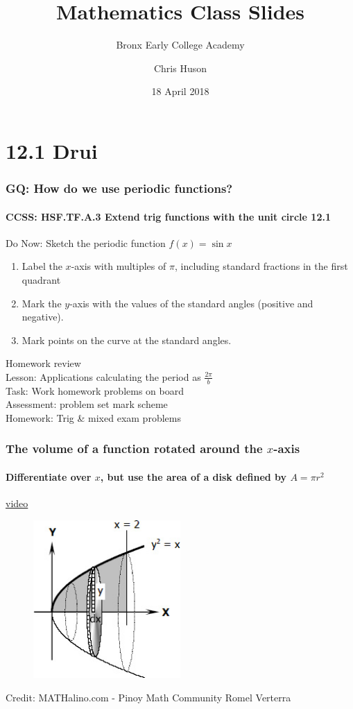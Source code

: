 \documentclass{beamer}
\title{Mathematics Class Slides}
\subtitle{Bronx Early College Academy}
\author{Chris Huson}
\date{18 April 2018}
\begin{document}
\frame{\titlepage}


\section{12.1 Drui}
\frame
{
  \frametitle{GQ: How do we use periodic functions?}
  \framesubtitle{CCSS: HSF.TF.A.3 Extend trig functions with the unit circle \qquad \alert{12.1}}

  \begin{block}{Do Now: Sketch the periodic function $f(x)=\sin{x}$}
    \begin{enumerate}
    \item Label the $x$-axis with multiples of $\pi$, including standard fractions in the first quadrant
    \item Mark the $y$-axis with the values of the standard angles (positive and negative).
    \item Mark points on the curve at the standard angles.
    \end{enumerate}
 \end{block}
  Homework review\\[5pt]
  Lesson: Applications calculating the period as $\frac{2\pi}{b}$\\%
  Task: Work homework problems on board\\%
  Assessment: problem set mark scheme\\%
  Homework: Trig \& mixed exam problems
}

\frame
{
  \frametitle{The volume of a function rotated around the $x$-axis}
  \framesubtitle{Differentiate over $x$, but use the area of a disk defined by $A=\pi r^2$}
\href{https://www.youtube.com/watch?v=i4L5XoUBD_Q}{video}\\
\begin{figure}[!ht]
    \centering
    \includegraphics[width=0.5\textwidth]{0413CW-paraboloid.jpg}
\end{figure}
\small{Credit: MATHalino.com - Pinoy Math Community Romel Verterra}
}
\end{document}
